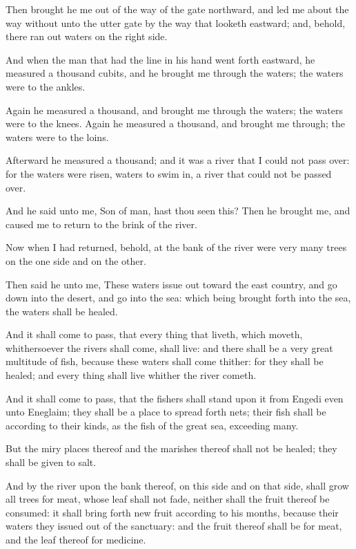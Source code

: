 \verse Then brought he me out of the way of the gate northward, and led me about the way without unto the utter gate by the way that looketh eastward; and, behold, there ran out waters on the right side.

\verse And when the man that had the line in his hand went forth eastward, he measured a thousand cubits, and he brought me through the waters; the waters were to the ankles.

\verse Again he measured a thousand, and brought me through the waters; the waters were to the knees. Again he measured a thousand, and brought me through; the waters were to the loins.

\verse Afterward he measured a thousand; and it was a river that I could not pass over: for the waters were risen, waters to swim in, a river that could not be passed over.

\verse And he said unto me, Son of man, hast thou seen this? Then he brought me, and caused me to return to the brink of the river.

\verse Now when I had returned, behold, at the bank of the river were very many trees on the one side and on the other.

\verse Then said he unto me, These waters issue out toward the east country, and go down into the desert, and go into the sea: which being brought forth into the sea, the waters shall be healed.

\verse And it shall come to pass, that every thing that liveth, which moveth, whithersoever the rivers shall come, shall live: and there shall be a very great multitude of fish, because these waters shall come thither: for they shall be healed; and every thing shall live whither the river cometh.

\verse And it shall come to pass, that the fishers shall stand upon it from Engedi even unto Eneglaim; they shall be a place to spread forth nets; their fish shall be according to their kinds, as the fish of the great sea, exceeding many.

\verse But the miry places thereof and the marishes thereof shall not be healed; they shall be given to salt.

\verse And by the river upon the bank thereof, on this side and on that side, shall grow all trees for meat, whose leaf shall not fade, neither shall the fruit thereof be consumed: it shall bring forth new fruit according to his months, because their waters they issued out of the sanctuary: and the fruit thereof shall be for meat, and the leaf thereof for medicine.

